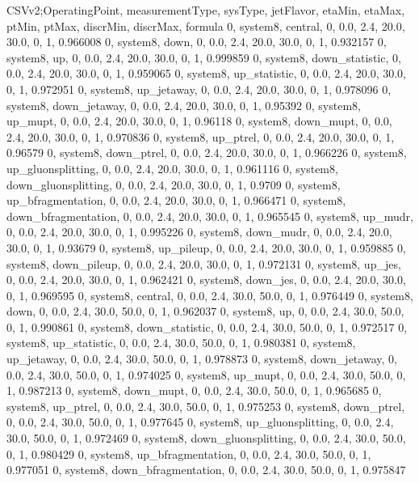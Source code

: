 CSVv2;OperatingPoint, measurementType, sysType, jetFlavor, etaMin, etaMax, ptMin, ptMax, discrMin, discrMax, formula
0, system8, central,    0, 0.0, 2.4, 20.0, 30.0, 0, 1, 0.966008
0, system8, down,       0, 0.0, 2.4, 20.0, 30.0, 0, 1, 0.932157
0, system8, up,         0, 0.0, 2.4, 20.0, 30.0, 0, 1, 0.999859
0, system8, down_statistic,       0, 0.0, 2.4, 20.0, 30.0, 0, 1, 0.959065
0, system8, up_statistic,         0, 0.0, 2.4, 20.0, 30.0, 0, 1, 0.972951
0, system8, up_jetaway,      0, 0.0, 2.4, 20.0, 30.0, 0, 1, 0.978096
0, system8, down_jetaway,    0, 0.0, 2.4, 20.0, 30.0, 0, 1, 0.95392
0, system8, up_mupt,         0, 0.0, 2.4, 20.0, 30.0, 0, 1, 0.96118
0, system8, down_mupt,       0, 0.0, 2.4, 20.0, 30.0, 0, 1, 0.970836
0, system8, up_ptrel,        0, 0.0, 2.4, 20.0, 30.0, 0, 1, 0.96579
0, system8, down_ptrel,      0, 0.0, 2.4, 20.0, 30.0, 0, 1, 0.966226
0, system8, up_gluonsplitting, 0, 0.0, 2.4, 20.0, 30.0, 0, 1, 0.961116
0, system8, down_gluonsplitting, 0, 0.0, 2.4, 20.0, 30.0, 0, 1, 0.9709
0, system8, up_bfragmentation, 0, 0.0, 2.4, 20.0, 30.0, 0, 1, 0.966471
0, system8, down_bfragmentation, 0, 0.0, 2.4, 20.0, 30.0, 0, 1, 0.965545
0, system8, up_mudr,         0, 0.0, 2.4, 20.0, 30.0, 0, 1, 0.995226
0, system8, down_mudr,       0, 0.0, 2.4, 20.0, 30.0, 0, 1, 0.93679
0, system8, up_pileup,       0, 0.0, 2.4, 20.0, 30.0, 0, 1, 0.959885
0, system8, down_pileup,     0, 0.0, 2.4, 20.0, 30.0, 0, 1, 0.972131
0, system8, up_jes,          0, 0.0, 2.4, 20.0, 30.0, 0, 1, 0.962421
0, system8, down_jes,        0, 0.0, 2.4, 20.0, 30.0, 0, 1, 0.969595
0, system8, central,    0, 0.0, 2.4, 30.0, 50.0, 0, 1, 0.976449
0, system8, down,       0, 0.0, 2.4, 30.0, 50.0, 0, 1, 0.962037
0, system8, up,         0, 0.0, 2.4, 30.0, 50.0, 0, 1, 0.990861
0, system8, down_statistic,       0, 0.0, 2.4, 30.0, 50.0, 0, 1, 0.972517
0, system8, up_statistic,         0, 0.0, 2.4, 30.0, 50.0, 0, 1, 0.980381
0, system8, up_jetaway,      0, 0.0, 2.4, 30.0, 50.0, 0, 1, 0.978873
0, system8, down_jetaway,    0, 0.0, 2.4, 30.0, 50.0, 0, 1, 0.974025
0, system8, up_mupt,         0, 0.0, 2.4, 30.0, 50.0, 0, 1, 0.987213
0, system8, down_mupt,       0, 0.0, 2.4, 30.0, 50.0, 0, 1, 0.965685
0, system8, up_ptrel,        0, 0.0, 2.4, 30.0, 50.0, 0, 1, 0.975253
0, system8, down_ptrel,      0, 0.0, 2.4, 30.0, 50.0, 0, 1, 0.977645
0, system8, up_gluonsplitting, 0, 0.0, 2.4, 30.0, 50.0, 0, 1, 0.972469
0, system8, down_gluonsplitting, 0, 0.0, 2.4, 30.0, 50.0, 0, 1, 0.980429
0, system8, up_bfragmentation, 0, 0.0, 2.4, 30.0, 50.0, 0, 1, 0.977051
0, system8, down_bfragmentation, 0, 0.0, 2.4, 30.0, 50.0, 0, 1, 0.975847
